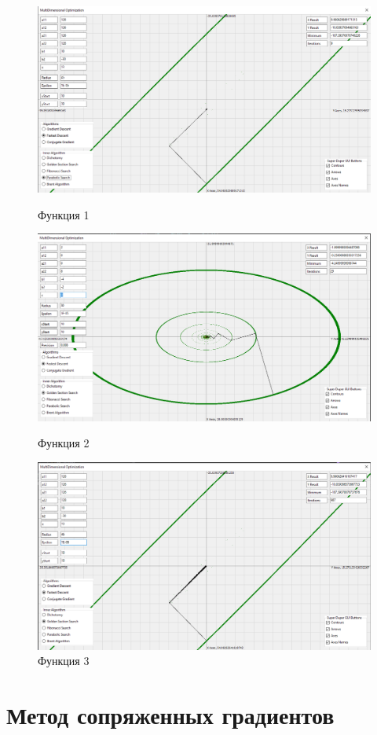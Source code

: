 \documentclass[12pt]{article}
\begin{document}
\begin{figure}[H]
	\centering
	\includegraphics[scale=0.3]{img/1_fd.png}
	\caption{Функция 1}
	\includegraphics[scale=0.3]{img/2_fd.png}
	\caption{Функция 2}
	\includegraphics[scale=0.3]{img/3_fd.png}
	\caption{Функция 3}
\end{figure}

\newpage
\section{Метод сопряженных градиентов}
\end{document}
